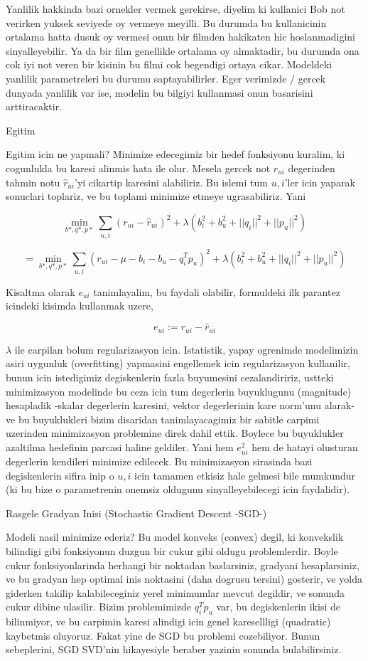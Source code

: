 \documentclass[12pt,fleqn]{article}\usepackage{../common}
\begin{document}
Yanlilik hakkinda bazi ornekler vermek gerekirse, diyelim ki kullanici Bob
not verirken yuksek seviyede oy vermeye meyilli. Bu durumda bu kullanicinin
ortalama hatta dusuk oy vermesi onun bir filmden hakikaten hic
hoslanmadigini sinyalleyebilir. Ya da bir film genellikle ortalama oy
almaktadir, bu durumda ona cok iyi not veren bir kisinin bu filmi cok
begendigi ortaya cikar. Modeldeki yanlilik parametreleri bu durumu
saptayabilirler. Eger verimizde / gercek dunyada yanlilik var ise, modelin
bu bilgiyi kullanmasi onun basarisini arttiracaktir.

Egitim

Egitim icin ne yapmali? Minimize edecegimiz bir hedef fonksiyonu kuralim,
ki cogunlukla bu karesi alinmis hata ile olur. Mesela gercek not
$r_{ui}$ degerinden tahmin notu $\hat{r}_{ui}$'yi cikartip karesini
alabiliriz. Bu islemi tum $u,i$'ler icin yaparak sonuclari toplariz, ve bu
toplami minimize etmeye ugrasabiliriz. Yani


$$
\min_{b*,q*,p*} \sum_{u,i} (r_{ui} - \hat{r}_{ui})^2 + 
\lambda (b_i^2 + b_u^2 + ||q_i||^2 + ||p_u||^2)
$$

$$
= \min_{b*,q*,p*} \sum_{u,i} (r_{ui} - \mu - b_i - b_u - q_i^Tp_u)^2 + 
\lambda (b_i^2 + b_u^2 + ||q_i||^2 + ||p_u||^2)
$$

Kisaltma olarak $e_{ui}$ tanimlayalim, bu faydali olabilir, formuldeki ilk
parantez icindeki kisimda kullanmak uzere,

$$ e_{ui} := r_{ui} - \hat{r}_{ui} $$

$\lambda$ ile carpilan bolum regularizasyon icin. Istatistik, yapay
ogrenimde modelimizin asiri uygunluk (overfitting) yapmasini engellemek
icin regularizasyon kullanilir, bunun icin istedigimiz degiskenlerin fazla
buyumesini cezalandiririz, ustteki minimizasyon modelinde bu ceza icin tum
degerlerin buyuklugunu (magnitude) hesapladik -skalar degerlerin karesini,
vektor degerlerinin kare norm'unu alarak- ve bu buyuklukleri bizim
disaridan tanimlayacagimiz bir sabitle carpimi uzerinden minimizasyon
problemine direk dahil ettik. Boylece bu buyuklukler azaltilma hedefinin
parcasi haline geldiler. Yani hem $e_{ui}^2$ hem de hatayi olusturan
degerlerin kendileri minimize edilecek. Bu minimizasyon sirasinda bazi
degiskenlerin sifira inip o $u,i$ icin tamamen etkisiz hale gelmesi bile
mumkundur (ki bu bize o parametrenin onemsiz oldugunu sinyalleyebilecegi
icin faydalidir). 

Rasgele Gradyan Inisi (Stochastic Gradient Descent -SGD-)

Modeli nasil minimize ederiz? Bu model konveks (convex) degil, ki
konvekslik bilindigi gibi fonksiyonun duzgun bir cukur gibi oldugu
problemlerdir. Boyle cukur fonksiyonlarinda herhangi bir noktadan
baslarsiniz, gradyani hesaplarsiniz, ve bu gradyan hep optimal inis
noktasini (daha dogrusu tersini) gosterir, ve yolda giderken takilip
kalabileceginiz yerel minimumlar mevcut degildir, ve sonunda cukur dibine
ulasilir. Bizim problemimizde $q_i^Tp_u$ var, bu degiskenlerin ikisi de
bilinmiyor, ve bu carpimin karesi alindigi icin genel karesellligi
(quadratic) kaybetmis oluyoruz. Fakat yine de SGD bu problemi
cozebiliyor. Bunun sebeplerini, SGD SVD'nin hikayesiyle beraber yazinin
sonunda bulabilirsiniz.
\end{document}
